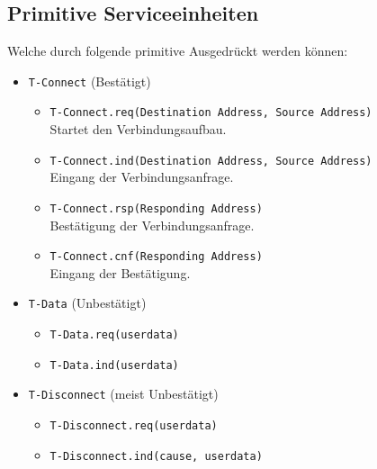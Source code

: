 		\subsection{Primitive Serviceeinheiten}
			Welche durch folgende primitive Ausgedrückt werden können:
			\begin{itemize}
				\item \texttt{T-Connect} (Bestätigt)
					\begin{itemize}
						\item \texttt{T-Connect.req(Destination Address, Source Address)} \\ Startet den Verbindungsaufbau.
						\item \texttt{T-Connect.ind(Destination Address, Source Address)} \\ Eingang der Verbindungsanfrage.
						\item \texttt{T-Connect.rsp(Responding Address)} \\ Bestätigung der Verbindungsanfrage.
						\item \texttt{T-Connect.cnf(Responding Address)} \\ Eingang der Bestätigung.
					\end{itemize}
				\item \texttt{T-Data} (Unbestätigt)
					\begin{itemize}
						\item \texttt{T-Data.req(userdata)}
						\item \texttt{T-Data.ind(userdata)}
					\end{itemize}
				\item \texttt{T-Disconnect} (meist Unbestätigt)
					\begin{itemize}
						\item \texttt{T-Disconnect.req(userdata)}
						\item \texttt{T-Disconnect.ind(cause, userdata)}
					\end{itemize}
			\end{itemize}

